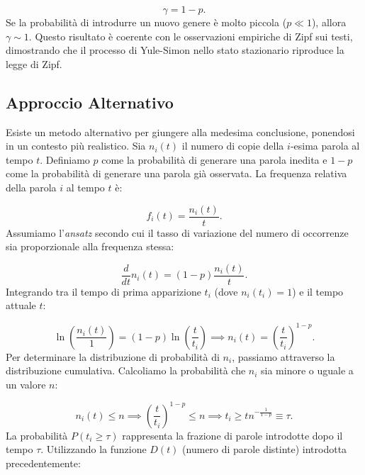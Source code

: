 \begin{equation}
    \gamma = 1-p.
\end{equation}
Se la probabilità di introdurre un nuovo genere è molto piccola ($p \ll 1$), allora $\gamma \sim 1$. Questo risultato è coerente con le osservazioni empiriche di Zipf sui testi, dimostrando che il processo di Yule-Simon nello stato stazionario riproduce la legge di Zipf.

\subsection{Approccio Alternativo}

Esiste un metodo alternativo per giungere alla medesima conclusione, ponendosi in un contesto più realistico.
Sia $n_i(t)$ il numero di copie della $i$-esima parola al tempo $t$. Definiamo $p$ come la probabilità di generare una parola inedita e $1-p$ come la probabilità di generare una parola già osservata.
La frequenza relativa della parola $i$ al tempo $t$ è:

\begin{equation}
    f_i(t) = \frac{n_i(t)}{t}.
\end{equation}
Assumiamo l'\textit{ansatz} secondo cui il tasso di variazione del numero di occorrenze sia proporzionale alla frequenza stessa:

\begin{equation}
    \frac{d}{dt}n_i(t) = (1-p)\frac{n_i(t)}{t}.
\end{equation}
Integrando tra il tempo di prima apparizione $t_i$ (dove $n_i(t_i)=1$) e il tempo attuale $t$:

\begin{equation}
    \ln\left(\frac{n_i(t)}{1}\right) = (1-p) \ln\left(\frac{t}{t_i}\right) \implies n_i(t) = \left( \frac{t}{t_i} \right)^{1-p}.
\end{equation}
Per determinare la distribuzione di probabilità di $n_i$, passiamo attraverso la distribuzione cumulativa. Calcoliamo la probabilità che $n_i$ sia minore o uguale a un valore $n$:

\begin{equation}
    n_i(t) \le n \implies \left(\frac{t}{t_i}\right)^{1-p} \le n \implies t_i \ge t n^{-\frac{1}{1-p}} \equiv \tau.
\end{equation}
La probabilità $P(t_i \ge \tau)$ rappresenta la frazione di parole introdotte dopo il tempo $\tau$. Utilizzando la funzione $D(t)$ (numero di parole distinte) introdotta precedentemente:

